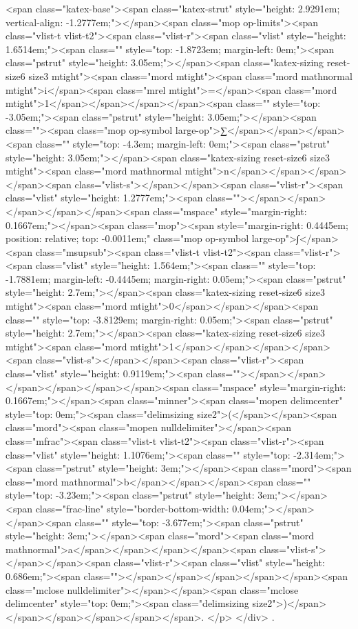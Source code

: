 <span class="katex-base"><span class="katex-strut" style="height: 2.9291em; vertical-align: -1.2777em;"></span><span class="mop op-limits"><span class="vlist-t vlist-t2"><span class="vlist-r"><span class="vlist" style="height: 1.6514em;"><span class="" style="top: -1.8723em; margin-left: 0em;"><span class="pstrut" style="height: 3.05em;"></span><span class="katex-sizing reset-size6 size3 mtight"><span class="mord mtight"><span class="mord mathnormal mtight">i</span><span class="mrel mtight">=</span><span class="mord mtight">1</span></span></span></span><span class="" style="top: -3.05em;"><span class="pstrut" style="height: 3.05em;"></span><span class=""><span class="mop op-symbol large-op">∑</span></span></span><span class="" style="top: -4.3em; margin-left: 0em;"><span class="pstrut" style="height: 3.05em;"></span><span class="katex-sizing reset-size6 size3 mtight"><span class="mord mathnormal mtight">n</span></span></span></span><span class="vlist-s">​</span></span><span class="vlist-r"><span class="vlist" style="height: 1.2777em;"><span class=""></span></span></span></span></span><span class="mspace" style="margin-right: 0.1667em;"></span><span class="mop"><span style="margin-right: 0.4445em; position: relative; top: -0.0011em;" class="mop op-symbol large-op">∫</span><span class="msupsub"><span class="vlist-t vlist-t2"><span class="vlist-r"><span class="vlist" style="height: 1.564em;"><span class="" style="top: -1.7881em; margin-left: -0.4445em; margin-right: 0.05em;"><span class="pstrut" style="height: 2.7em;"></span><span class="katex-sizing reset-size6 size3 mtight"><span class="mord mtight">0</span></span></span><span class="" style="top: -3.8129em; margin-right: 0.05em;"><span class="pstrut" style="height: 2.7em;"></span><span class="katex-sizing reset-size6 size3 mtight"><span class="mord mtight">1</span></span></span></span><span class="vlist-s">​</span></span><span class="vlist-r"><span class="vlist" style="height: 0.9119em;"><span class=""></span></span></span></span></span></span><span class="mspace" style="margin-right: 0.1667em;"></span><span class="minner"><span class="mopen delimcenter" style="top: 0em;"><span class="delimsizing size2">(</span></span><span class="mord"><span class="mopen nulldelimiter"></span><span class="mfrac"><span class="vlist-t vlist-t2"><span class="vlist-r"><span class="vlist" style="height: 1.1076em;"><span class="" style="top: -2.314em;"><span class="pstrut" style="height: 3em;"></span><span class="mord"><span class="mord mathnormal">b</span></span></span><span class="" style="top: -3.23em;"><span class="pstrut" style="height: 3em;"></span><span class="frac-line" style="border-bottom-width: 0.04em;"></span></span><span class="" style="top: -3.677em;"><span class="pstrut" style="height: 3em;"></span><span class="mord"><span class="mord mathnormal">a</span></span></span></span><span class="vlist-s">​</span></span><span class="vlist-r"><span class="vlist" style="height: 0.686em;"><span class=""></span></span></span></span></span><span class="mclose nulldelimiter"></span></span><span class="mclose delimcenter" style="top: 0em;"><span class="delimsizing size2">)</span></span></span></span></span></span>.
</p>
</div>
.

